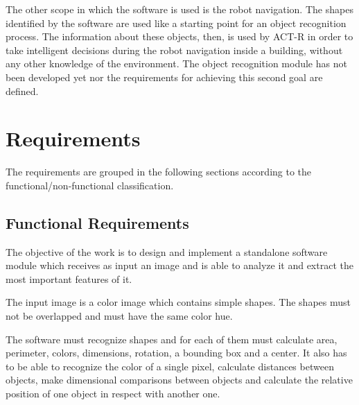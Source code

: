 	The other scope in which the software is used is the robot navigation. 
	The shapes identified by the software are used like a starting point for an object recognition process. 
	The information about these objects, then, is used by ACT-R in order to take intelligent decisions during the robot navigation inside a building, without any other knowledge of the environment. The object recognition module has not been developed yet nor the requirements for achieving this second goal are defined. 

\begin{comment}
	The feature recognition, in particular, will be used by ACT-R in order to recognize objects starting from the simple shapes recognized by the software
 further use of the software is that the feature extraction process that is going to be implemented is used like an object recognition to be used during the robot navigation inside a building. 
\end{comment}	

	\section{Requirements}
	The requirements are grouped in the following sections according to the functional/non-functional classification. 

		\subsection{Functional Requirements}
		The objective of the work is to design and implement a standalone software module which receives as input an image and is able to analyze it and extract the most important features of it.

		The input image is a color image which contains simple shapes. The shapes must not be overlapped and must have the same color hue.

		The software must recognize shapes and for each of them must calculate area, perimeter, colors, dimensions, rotation, a bounding box and a center. It also has to be able to recognize the color of a single pixel, calculate distances between objects, make dimensional comparisons between objects and calculate the relative position of one object in respect with another one.

